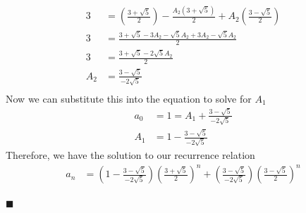 \documentclass[12pt]{article}
\renewcommand{\qed}{\hfill$\blacksquare$}
\begin{document}
\begin{addmargin}[1em]{1em}
\begin{align*}
        3 &= (\frac{3 + \sqrt{5}}{2}) - \frac{A_2(3 + \sqrt{5})}{2} + A_2(\frac{3 - \sqrt{5}}{2})\\
        3 &= \frac{3 + \sqrt{5} - 3A_2 - \sqrt{5}A_2 + 3A_2 - \sqrt{5}A_2}{2}\\
        3 &= \frac{3 + \sqrt{5} - 2\sqrt{5}A_2}{2}\\
        A_2 &= \frac{3-\sqrt{5}}{-2\sqrt{5}}\\
    \end{align*}
    Now we can substitute this into the equation to solve for $A_1$\\
    \begin{align*}
        a_0 &= 1 = A_1 + \frac{3-\sqrt{5}}{-2\sqrt{5}}\\
        A_1 &= 1 - \frac{3-\sqrt{5}}{-2\sqrt{5}}
    \end{align*}
    Therefore, we have the solution to our recurrence relation
    \begin{align*}
        a_n &= (1 - \frac{3-\sqrt{5}}{-2\sqrt{5}})(\frac{3 + \sqrt{5}}{2})^n + (\frac{3-\sqrt{5}}{-2\sqrt{5}})(\frac{3 - \sqrt{5}}{2})^n\\
    \end{align*}
    \begin{flushright}
    \qed
    \end{flushright}
\end{addmargin}
\end{document}

